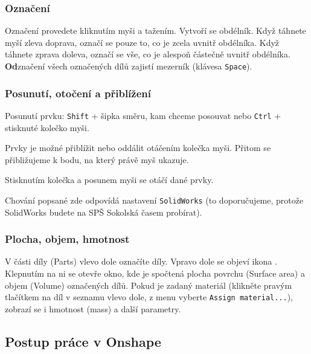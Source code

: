 



\subsubsection{Označení}

Označení provedete kliknutím myši a tažením. Vytvoří se obdélník. Když táhnete myší zleva doprava, označí se pouze to, co je zcela uvnitř obdélníka. 
Když táhnete zprava doleva, označí se vše, co je alespoň částečně uvnitř obdélníka. \textbf{Od}značení všech označených dílů zajistí mezerník (klávesa {\tt Space}). 


\subsubsection{Posunutí, otočení a přiblížení}

Posunutí prvku: {\tt Shift}  + šipka směru, kam chceme posouvat nebo {\tt Ctrl} + stisknuté kolečko myši.  

Prvky je možné přiblížit nebo oddálit otáčením kolečka myši. Přitom se přibližujeme k bodu, na který právě myš ukazuje. 

Stisknutím kolečka a posunem myši se otáčí dané prvky. 

Chování popsané zde odpovídá nastavení \texttt{SolidWorks} (to doporučujeme, protože SolidWorks budete na SPŠ Sokolská časem probírat).


\subsubsection{Plocha, objem, hmotnost}

V části díly (Parts) vlevo dole označíte díly. Vpravo dole se objeví ikona . 
Klepnutím na ni se otevře okno, kde je spočtená plocha povrchu (Surface area) a objem (Volume) označených dílů. 
Pokud je zadaný materiál (klikněte pravým tlačítkem na díl v seznamu vlevo dole, z menu vyberte {\tt Assign material...}), zobrazí se i hmotnost (mass) a další parametry.


\subsection{Postup práce v Onshape}
 
